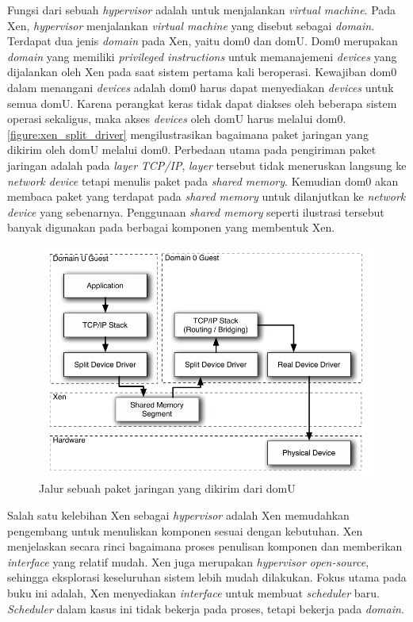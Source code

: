 Fungsi dari sebuah \textit{hypervisor} adalah untuk menjalankan \textit{virtual machine}.  Pada
Xen, \textit{hypervisor} menjalankan \textit{virtual machine} yang disebut sebagai
\textit{domain}.  Terdapat dua jenis \textit{domain} pada Xen, yaitu dom0 dan domU.  Dom0
merupakan \textit{domain} yang memiliki \textit{privileged instructions} untuk memanajemeni
\textit{devices} yang dijalankan oleh Xen pada saat sistem pertama kali beroperasi.  Kewajiban
dom0 dalam menangani \textit{devices} adalah dom0 harus dapat menyediakan \textit{devices} untuk
semua domU.  Karena perangkat keras tidak dapat diakses oleh beberapa sistem operasi sekaligus,
maka akses \textit{devices} oleh domU harus melalui dom0.  \autoref{figure:xen_split_driver}
mengilustrasikan bagaimana paket jaringan yang dikirim oleh domU melalui dom0.  Perbedaan utama
pada pengiriman paket jaringan adalah pada \textit{layer} \textit{TCP/IP}, \textit{layer}
tersebut tidak meneruskan langsung ke \textit{network device} tetapi menulis paket pada
\textit{shared memory}.  Kemudian dom0 akan membaca paket yang terdapat pada \textit{shared
memory} untuk dilanjutkan ke \textit{network device} yang sebenarnya.  Penggunaan \textit{shared
memory} seperti ilustrasi tersebut banyak digunakan pada berbagai komponen yang membentuk Xen.

\begin{figure}[!ht]
    \includegraphics[scale=0.5]{./resources/xen-split-driver.png}
    \caption[Jalur sebuah paket jaringan yang dikirim dari domU]{Jalur sebuah paket jaringan yang dikirim dari domU \citep{Chisnall2014}}
    \label{figure:xen_split_driver}
\end{figure}

Salah satu kelebihan Xen sebagai \textit{hypervisor} adalah Xen memudahkan pengembang untuk
menuliskan komponen sesuai dengan kebutuhan.  Xen menjelaskan secara rinci bagaimana proses
penulisan komponen dan memberikan \textit{interface} yang relatif mudah.  Xen juga merupakan
\textit{hypervisor} \textit{open-source}, sehingga eksplorasi keseluruhan sistem lebih mudah
dilakukan.  Fokus utama pada buku ini adalah, Xen menyediakan \textit{interface} untuk membuat
\textit{scheduler} baru.  \textit{Scheduler} dalam kasus ini tidak bekerja pada proses,
tetapi bekerja pada \textit{domain}.

